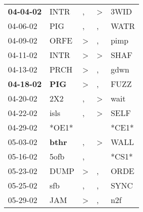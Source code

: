 \begin{supertabular}{p{0.07\textwidth}p{0.06\textwidth}p{0.02\textwidth}p{0.02\textwidth}p{0.06\textwidth}}
 \textbf{04-04-02\textsuperscript{}} &           INTR\textsuperscript{} &                , &     \textgreater &           3WID\textsuperscript{} \\
          04-06-02\textsuperscript{} &            PIG\textsuperscript{} &                , &                , &           WATR\textsuperscript{} \\
          04-09-02\textsuperscript{} &           ORFE\textsuperscript{} &     \textgreater &                , &           pimp\textsuperscript{} \\
          04-11-02\textsuperscript{} &           INTR\textsuperscript{} &     \textgreater &     \textgreater &           SHAF\textsuperscript{} \\
          04-13-02\textsuperscript{} &           PRCH\textsuperscript{} &     \textgreater &                , &           gdwn\textsuperscript{} \\
 \textbf{04-18-02\textsuperscript{}} &   \textbf{PIG\textsuperscript{}} &     \textgreater &                , &           FUZZ\textsuperscript{} \\
          04-20-02\textsuperscript{} &            2X2\textsuperscript{} &                , &     \textgreater &           wait\textsuperscript{} \\
          04-22-02\textsuperscript{} &           isls\textsuperscript{} &                , &     \textgreater &           SELF\textsuperscript{} \\
          04-29-02\textsuperscript{} &                            *OE1* &                  &                  &                            *CE1* \\
          05-03-02\textsuperscript{} &  \textbf{bthr\textsuperscript{}} &                , &     \textgreater &           WALL\textsuperscript{} \\
          05-16-02\textsuperscript{} &           5ofb\textsuperscript{} &                , &                  &                            *CS1* \\
          05-23-02\textsuperscript{} &           DUMP\textsuperscript{} &     \textgreater &                , &           ORDE\textsuperscript{} \\
          05-25-02\textsuperscript{} &            sfb\textsuperscript{} &                , &                , &           SYNC\textsuperscript{} \\
          05-29-02\textsuperscript{} &            JAM\textsuperscript{} &     \textgreater &                , &            n2f\textsuperscript{} \\

\end{supertabular}
